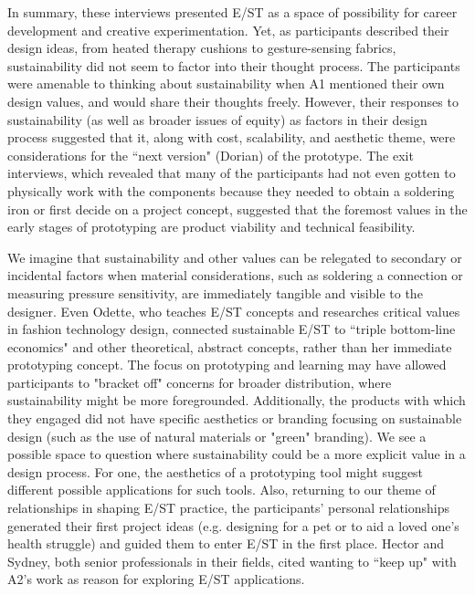 \documentclass[manuscript,review,anonymous]{acmart}
\begin{document}
In summary, these interviews presented E/ST as a space of possibility for career development and creative experimentation. Yet, as participants described their design ideas, from heated therapy cushions to gesture-sensing fabrics, sustainability did not seem to factor into their thought process. The participants were amenable to thinking about sustainability when A1 mentioned their own design values, and would share their thoughts freely. However, their responses to sustainability (as well as broader issues of equity) as factors in their design process suggested that it, along with cost, scalability, and aesthetic theme, were considerations for the ``next version" (Dorian) of the prototype. The exit interviews, which revealed that many of the participants had not even gotten to physically work with the components because they needed to obtain a soldering iron or first decide on a project concept, suggested that the foremost values in the early stages of prototyping are product viability and technical feasibility. 

We imagine that sustainability and other values can be relegated to secondary or incidental factors when material considerations, such as soldering a connection or measuring pressure sensitivity, are immediately tangible and visible to the designer. Even Odette, who teaches E/ST concepts and researches critical values in fashion technology design, connected sustainable E/ST to ``triple bottom-line economics" and other theoretical, abstract concepts, rather than her immediate prototyping concept. The focus on prototyping and learning may have allowed participants to "bracket off" concerns for broader distribution, where sustainability might be more foregrounded. Additionally, the products with which they engaged did not have specific aesthetics or branding focusing on sustainable design (such as the use of natural materials or "green" branding). We see a possible space to question where sustainability could be a more explicit value in a design process. For one, the aesthetics of a prototyping tool might suggest different possible applications for such tools. Also, returning to our theme of relationships in shaping E/ST practice, the participants' personal relationships generated their first project ideas (e.g. designing for a pet or to aid a loved one's health struggle) and guided them to enter E/ST in the first place. Hector and Sydney, both senior professionals in their fields, cited wanting to ``keep up" with A2's work as reason for exploring E/ST applications.
\end{document}
